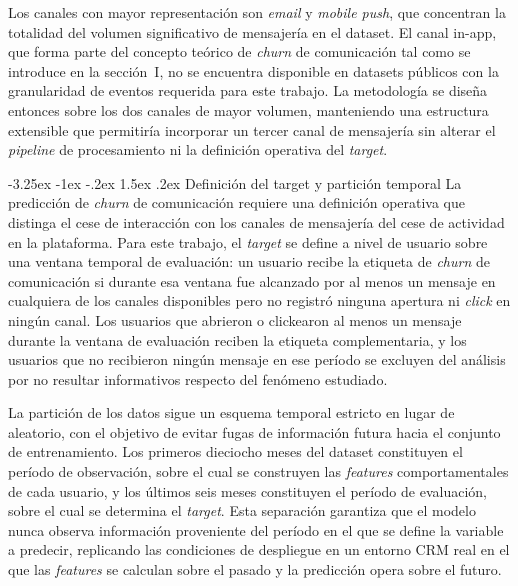 \documentclass[11pt,a4paper]{article}
\makeatletter
\renewcommand\subsection{\@startsection{subsection}{2}{\z@}%
  {-3.25ex \@plus -1ex \@minus -.2ex}%
  {1.5ex \@plus .2ex}%
  {\normalfont\normalsize\itshape}}
\makeatother
\begin{document}
Los canales con mayor representación son \textit{email} y \textit{mobile push}, que concentran la totalidad del volumen significativo de mensajería en el dataset. El canal in-app, que forma parte del concepto teórico de \textit{churn} de comunicación tal como se introduce en la sección~I, no se encuentra disponible en datasets públicos con la granularidad de eventos requerida para este trabajo. La metodología se diseña entonces sobre los dos canales de mayor volumen, manteniendo una estructura extensible que permitiría incorporar un tercer canal de mensajería sin alterar el \textit{pipeline} de procesamiento ni la definición operativa del \textit{target}.
 
\subsection{Definición del target y partición temporal}
La predicción de \textit{churn} de comunicación requiere una definición operativa que distinga el cese de interacción con los canales de mensajería del cese de actividad en la plataforma. Para este trabajo, el \textit{target} se define a nivel de usuario sobre una ventana temporal de evaluación: un usuario recibe la etiqueta de \textit{churn} de comunicación si durante esa ventana fue alcanzado por al menos un mensaje en cualquiera de los canales disponibles pero no registró ninguna apertura ni \textit{click} en ningún canal. Los usuarios que abrieron o clickearon al menos un mensaje durante la ventana de evaluación reciben la etiqueta complementaria, y los usuarios que no recibieron ningún mensaje en ese período se excluyen del análisis por no resultar informativos respecto del fenómeno estudiado.
 
La partición de los datos sigue un esquema temporal estricto en lugar de aleatorio, con el objetivo de evitar fugas de información futura hacia el conjunto de entrenamiento. Los primeros dieciocho meses del dataset constituyen el período de observación, sobre el cual se construyen las \textit{features} comportamentales de cada usuario, y los últimos seis meses constituyen el período de evaluación, sobre el cual se determina el \textit{target}. Esta separación garantiza que el modelo nunca observa información proveniente del período en el que se define la variable a predecir, replicando las condiciones de despliegue en un entorno CRM real en el que las \textit{features} se calculan sobre el pasado y la predicción opera sobre el futuro.
 
\end{document}
